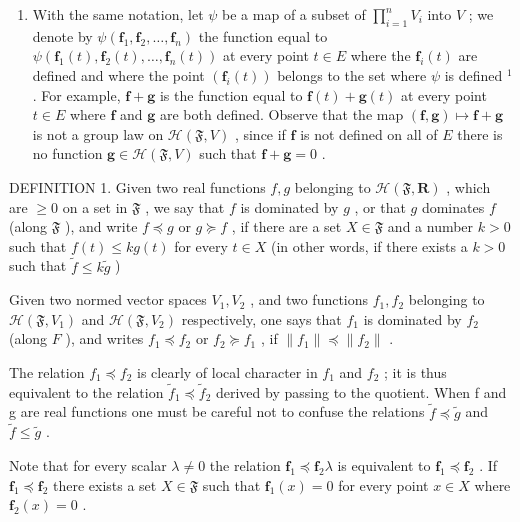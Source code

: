 \begin{enumerate}
\def\labelenumi{\arabic{enumi})}
\setcounter{enumi}{1}
\tightlist
\item
  With the same notation, let \(\psi\) be a map of a subset of \(\prod_{i=1}^{n} V_i\) into \(V\) ; we denote by \(\psi(\mathbf{f}_1, \mathbf{f}_2, \ldots, \mathbf{f}_n)\) the function equal to \(\psi(\mathbf{f}_1(t), \mathbf{f}_2(t), \ldots, \mathbf{f}_n(t))\) at every point \(t \in E\) where the \(\mathbf{f}_i(t)\) are defined and where the point \((\mathbf{f}_i(t))\) belongs to the set where \(\psi\) is defined \(^1\) . For example, \(\mathbf{f} + \mathbf{g}\) is the function equal to \(\mathbf{f}(t) + \mathbf{g}(t)\) at every point \(t \in E\) where \(\mathbf{f}\) and \(\mathbf{g}\) are both defined. Observe that the map \((\mathbf{f}, \mathbf{g}) \mapsto \mathbf{f} + \mathbf{g}\) is not a group law on \(\mathcal{H}(\mathfrak{F}, V)\) , since if \(\mathbf{f}\) is not defined on all of \(E\) there is no function \(\mathbf{g} \in \mathcal{H}(\mathfrak{F}, V)\) such that \(\mathbf{f} + \mathbf{g} = 0\) .
\end{enumerate}

DEFINITION 1. Given two real functions \(f, g\) belonging to \(\mathcal{H}(\mathfrak{F}, \mathbf{R})\) , which are \(\geqslant 0\) on a set in \(\mathfrak{F}\) , we say that \(f\) is dominated by \(g\) , or that \(g\) dominates \(f\) (along \(\mathfrak{F}\) ), and write \(f \preccurlyeq g\) or \(g \succcurlyeq f\) , if there are a set \(X \in \mathfrak{F}\) and a number \(k > 0\) such that \(f(t) \leqslant k g(t)\) for every \(t \in X\) (in other words, if there exists a \(k > 0\) such that \(\tilde{f} \leqslant k \tilde{g}\) )

Given two normed vector spaces \(V_{1}, V_{2}\) , and two functions \(f_{1}, f_{2}\) belonging to \(\mathcal{H}(\mathfrak{F}, V_{1})\) and \(\mathcal{H}(\mathfrak{F}, V_{2})\) respectively, one says that \(f_{1}\) is dominated by \(f_{2}\) (along \(F\) ), and writes \(f_{1} \preccurlyeq f_{2}\) or \(f_{2} \succcurlyeq f_{1}\) , if \(\|f_{1}\| \preccurlyeq \|f_{2}\|\) .

The relation \(f_{1} \preccurlyeq f_{2}\) is clearly of local character in \(f_{1}\) and \(f_{2}\) ; it is thus equivalent to the relation \(\tilde{f}_{1} \preccurlyeq \tilde{f}_{2}\) derived by passing to the quotient. When f and g are real functions one must be careful not to confuse the relations \(\tilde{f} \preccurlyeq \tilde{g}\) and \(\tilde{f} \leqslant \tilde{g}\) .

Note that for every scalar \(\lambda \neq 0\) the relation \(\mathbf{f}_1 \preccurlyeq \mathbf{f}_2\lambda\) is equivalent to \(\mathbf{f}_1 \preccurlyeq \mathbf{f}_2\) . If \(\mathbf{f}_1 \preccurlyeq \mathbf{f}_2\) there exists a set \(X \in \mathfrak{F}\) such that \(\mathbf{f}_1(x) = 0\) for every point \(x \in X\) where \(\mathbf{f}_2(x) = 0\) .

